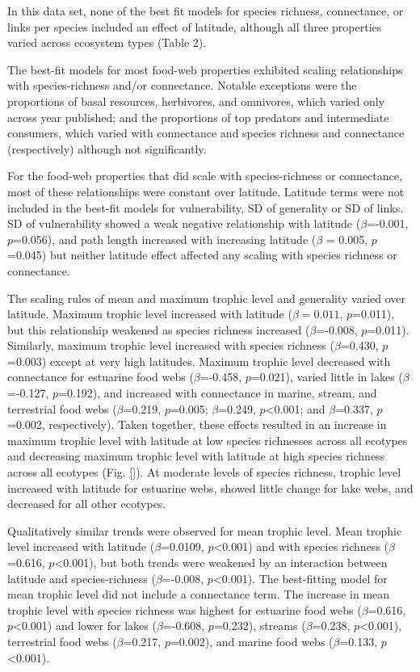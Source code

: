 \documentclass[12pt]{article}
\begin{document}
In this data set, none of the best fit models for species richness, connectance, or links per species included an 
effect of latitude, although all three properties varied across ecosystem types (Table 2). 


The best-fit models for most food-web properties exhibited scaling relationships with species-richness and/or 
connectance. Notable exceptions were the proportions of basal resources, herbivores, and omnivores, which varied only 
across year published; and the proportions of top predators and intermediate consumers, which varied with connectance 
and species richness and connectance (respectively) although not significantly.


For the food-web properties that did scale with species-richness or connectance, most of these relationships were 
constant over latitude. Latitude terms were not included in the best-fit models for vulnerability, SD of generality or 
SD of links. SD of vulnerability showed a weak negative relationship with latitude ($\beta$=-0.001, $p$=0.056), 
and path length increased with increasing 
latitude ($\beta$ = 0.005, $p$=0.045) but neither latitude effect affected any scaling with species richness or 
connectance.


The scaling rules of mean and maximum trophic level and generality varied over latitude. 
Maximum trophic level increased with 
latitude ($\beta=0.011$, $p$=0.011), but this relationship weakened as species richness increased 
($\beta$=-0.008, $p$=0.011). Similarly, maximum trophic level increased with species richness ($\beta$=0.430, $p$=0.003) 
except at very high latitudes. Maximum trophic level decreased with connectance for estuarine food webs 
($\beta$=-0.458, $p$=0.021), varied little in lakes ($\beta$=-0.127, $p$=0.192), and increased with connectance in
marine, stream, and terrestrial 
food webs ($\beta$=0.219, $p$=0.005; $\beta$=0.249, $p$<0.001; and $\beta$=0.337, $p$=0.002, respectively). Taken 
together, these effects resulted in an increase in maximum trophic level with latitude at low species richnesses across 
all ecotypes and decreasing maximum trophic level with latitude at high species richness across all ecotypes 
(Fig. \ref{}). At moderate levels of species richness, trophic level increased with latitude for estuarine webs, showed 
little change for lake webs, and decreased for all other ecotypes. 


Qualitatively similar trends were observed for mean trophic level. Mean trophic level increased with latitude 
($\beta$=0.0109, $p$<0.001) and with species richness ($\beta$=0.616, $p$<0.001), but both trends were weakened by an 
interaction between latitude and species-richness ($\beta$=-0.008, $p$<0.001). The best-fitting model for mean trophic 
level did not include a connectance term. The increase in mean trophic level with species richness was highest for 
estuarine food webs ($\beta$=0.616, $p$<0.001) and lower for lakes ($\beta$=-0.608, $p$=0.232), streams 
($\beta$=0.238, $p$<0.001), terrestrial food webs ($\beta$=0.217, $p$=0.002), and marine food webs 
($\beta$=0.133, $p$<0.001). 
\end{document}
